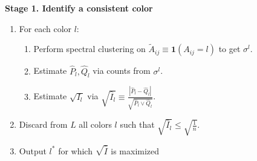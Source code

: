 \documentclass{article}
\begin{document}
\textbf{Stage 1. Identify a consistent color}
\begin{enumerate}
\item For each color $l$:
  \begin{enumerate}
   \item Perform spectral clustering on $\tilde{A}_{ij} \equiv \mathbf{1}(A_{ij} = l)$ to get $\sigma^l$. 
   \item Estimate $\hat{P}_l, \hat{Q}_l$ via counts from $\sigma^l$. 
   \item Estimate $\sqrt{I_l}$ via 
  $\sqrt{ \hat{I}_l } \equiv \frac{| \hat{P}_l - \hat{Q}_l |}{\sqrt{ \hat{P}_l \vee \hat{Q}_l}}$. 
   \end{enumerate}
\item Discard from $L$ all colors $l$ such that $\sqrt{\hat{I}_l} \leq \sqrt{ \frac{1}{n}}$.
\item Output $l^*$ for which $\sqrt{\hat{I}}$ is maximized
\end{enumerate}
\end{document}
